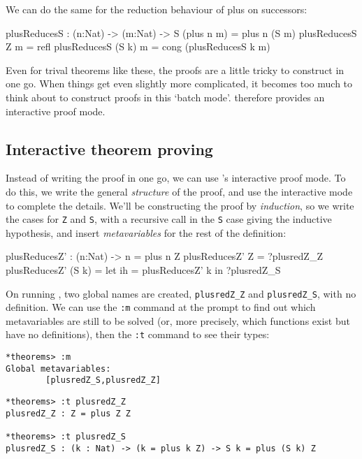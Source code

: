 \noindent
We can do the same for the reduction behaviour of plus on successors:

\begin{code}
plusReducesS : (n:Nat) -> (m:Nat) -> S (plus n m) = plus n (S m)
plusReducesS Z m = refl
plusReducesS (S k) m = cong (plusReducesS k m)
\end{code}

\noindent
Even for trival theorems like these, the proofs are a little tricky to construct in one go.
When things get even slightly more complicated, it becomes too much to think about to construct proofs in this `batch mode'.
\Idris{} therefore provides an interactive proof mode.

\subsection{Interactive theorem proving}

Instead of writing the proof in one go, we can use \Idris{}'s interactive proof mode. To do this, we write the general \emph{structure} of the proof, and use the interactive mode to complete the details.
We'll be constructing the proof by \emph{induction}, so we write the cases for \texttt{Z} and \texttt{S}, with a recursive call in the \texttt{S} case giving the inductive hypothesis, and insert \emph{metavariables} for the rest of the definition:

\begin{code}
plusReducesZ' : (n:Nat) -> n = plus n Z
plusReducesZ' Z     = ?plusredZ_Z
plusReducesZ' (S k) = let ih = plusReducesZ' k in
                      ?plusredZ_S
\end{code}

\noindent
On running \Idris{}, two global names are created, \texttt{plusredZ\_Z} and \texttt{plusredZ\_S}, with no definition.
We can use the \texttt{:m} command at the prompt to find out which metavariables are still to be solved (or, more precisely, which functions exist but have no definitions), then the \texttt{:t} command to see their types:

\begin{lstlisting}[style=stdout]
*theorems> :m 
Global metavariables:
        [plusredZ_S,plusredZ_Z]

\end{lstlisting}

\begin{lstlisting}[style=stdout]
*theorems> :t plusredZ_Z
plusredZ_Z : Z = plus Z Z

*theorems> :t plusredZ_S
plusredZ_S : (k : Nat) -> (k = plus k Z) -> S k = plus (S k) Z
\end{lstlisting}

